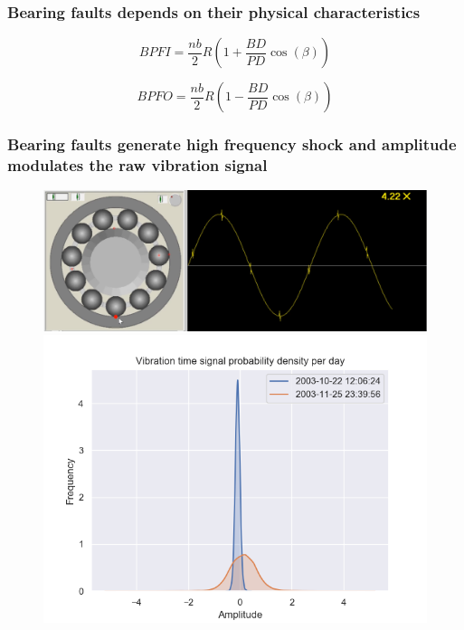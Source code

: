 \documentclass{beamer}
\begin{document}

\begin{frame}
	\frametitle{Bearing faults depends on their physical characteristics}
\begin{equation}
	BPFI = \frac{nb}{2}R\left(  1+ \frac{BD}{PD}\cos(\beta) \right)
\end{equation}

\begin{equation}
BPFO = \frac{nb}{2}R\left(  1- \frac{BD}{PD}\cos(\beta) \right)
\end{equation}
\end{frame}




\begin{frame}
	\frametitle{Bearing faults generate high frequency shock and amplitude modulates the raw vibration signal}
	\begin{figure}[H]
		\centering
		\includegraphics[width=0.5\linewidth]{outer-race1}
		\includegraphics[width=0.6\linewidth]{bpfi_density}
	\end{figure}
\end{frame}
\end{document}
